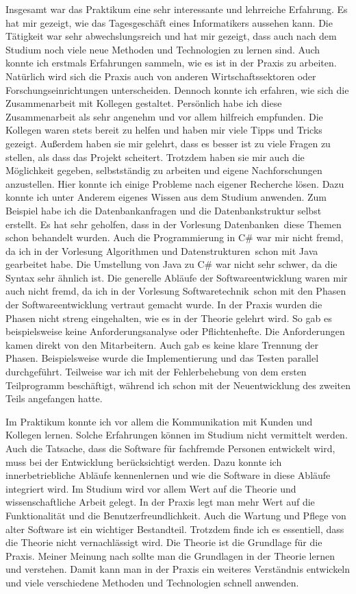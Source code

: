 \documentclass{Vorlage}
\begin{document}
Insgesamt war das Praktikum eine sehr interessante und lehrreiche Erfahrung. Es hat mir gezeigt, wie das 
Tagesgeschäft eines Informatikers aussehen kann. Die Tätigkeit war sehr abwechslungsreich und hat mir
gezeigt, dass auch nach dem Studium noch viele neue Methoden und Technologien zu lernen sind. Auch konnte 
ich erstmals Erfahrungen sammeln, wie es ist in der Praxis zu arbeiten. Natürlich wird sich die Praxis auch
von anderen Wirtschaftssektoren oder Forschungseinrichtungen unterscheiden. Dennoch konnte ich erfahren,
wie sich die Zusammenarbeit mit Kollegen gestaltet. Persönlich habe ich diese Zusammenarbeit als sehr angenehm
und vor allem hilfreich empfunden. Die Kollegen waren stets bereit zu helfen und haben mir viele Tipps und
Tricks gezeigt. Außerdem haben sie mir gelehrt, dass es besser ist zu viele Fragen zu stellen, als dass das
Projekt scheitert. Trotzdem haben sie mir auch die Möglichkeit gegeben, selbstständig zu arbeiten und eigene
Nachforschungen anzustellen. Hier konnte ich einige Probleme nach eigener Recherche lösen. Dazu konnte ich
unter Anderem eigenes Wissen aus dem Studium anwenden. Zum Beispiel habe ich die Datenbankanfragen und die
Datenbankstruktur selbst erstellt. Es hat sehr geholfen, dass in der Vorlesung \glqq Datenbanken\grqq \,
diese Themen schon behandelt wurden. Auch die Programmierung in C\# war mir nicht fremd, da ich in der
Vorlesung \glqq Algorithmen und Datenstrukturen\grqq \, schon mit Java gearbeitet habe. Die Umstellung
von Java zu C\# war nicht sehr schwer, da die Syntax sehr ähnlich ist. Die generelle Abläufe der
Softwareentwicklung waren mir auch nicht fremd, da ich in der Vorlesung \glqq Softwaretechnik\grqq \,
schon mit den Phasen der Softwareentwicklung vertraut gemacht wurde. 
In der Praxis wurden die Phasen nicht streng eingehalten, wie es in der Theorie gelehrt wird. So gab es
beispielsweise keine Anforderungsanalyse oder Pflichtenhefte. Die Anforderungen kamen direkt von den
Mitarbeitern. Auch gab es keine klare Trennung der Phasen. Beispielsweise wurde die Implementierung und
das Testen parallel durchgeführt. Teilweise war ich mit der Fehlerbehebung von dem ersten Teilprogramm
beschäftigt, während ich schon mit der Neuentwicklung des zweiten Teils angefangen hatte.

Im Praktikum konnte ich vor allem die Kommunikation mit Kunden und Kollegen lernen. Solche Erfahrungen
können im Studium nicht vermittelt werden. Auch die Tatsache, dass die Software für fachfremde Personen
entwickelt wird, muss bei der Entwicklung berücksichtigt werden. Dazu konnte ich innerbetriebliche
Abläufe kennenlernen und wie die Software in diese Abläufe integriert wird.
Im Studium wird vor allem Wert auf die Theorie und wissenschaftliche Arbeit gelegt. In der Praxis
legt man mehr Wert auf die Funktionalität und die Benutzerfreundlichkeit. Auch die Wartung und Pflege
von alter Software ist ein wichtiger Bestandteil. Trotzdem finde ich es essentiell, dass die Theorie 
nicht vernachlässigt wird. Die Theorie ist die Grundlage für die Praxis. Meiner Meinung nach sollte man
die Grundlagen in der Theorie lernen und verstehen. Damit kann man in der Praxis ein weiteres Verständnis
entwickeln und viele verschiedene Methoden und Technologien schnell anwenden.
\end{document}
